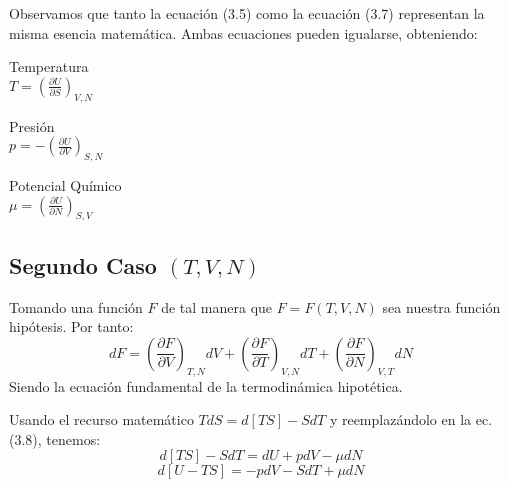 Observamos que tanto la ecuación (3.5) como la ecuación (3.7) representan la misma esencia matemática. Ambas ecuaciones pueden igualarse, obteniendo:

\begin{multicols}{3}
Temperatura \\[4pt]
$T = \left( \frac{\partial U}{\partial S} \right)_{V,N}$

\columnbreak

Presión \\[4pt]
$p = -\left( \frac{\partial U}{\partial V} \right)_{S,N}$

\columnbreak

Potencial Químico \\[4pt]
$\mu = \left( \frac{\partial U}{\partial N} \right)_{S,V}$
\end{multicols}

\subsection{Segundo Caso $(T,V,N)$}

Tomando una función $F$ de tal manera que $F = F(T,V,N)$ sea nuestra función hipótesis. Por tanto:
\begin{equation}
    dF =
    \left( \frac{\partial F}{\partial V} \right)_{T,N} dV +
    \left( \frac{\partial F}{\partial T} \right)_{V,N} dT +
    \left( \frac{\partial F}{\partial N} \right)_{V,T} dN \tag{3.8}
\end{equation}
Siendo la ecuación fundamental de la termodinámica hipotética.

Usando el recurso matemático $TdS = d[TS] - SdT$ y reemplazándolo en la ec. (3.8), tenemos:
\begin{equation}
    d[TS] - SdT = dU + pdV - \mu dN \tag{3.9}
\end{equation}
\begin{equation}
    d[U - TS] = -pdV - SdT + \mu dN \tag{3.10}
\end{equation}
